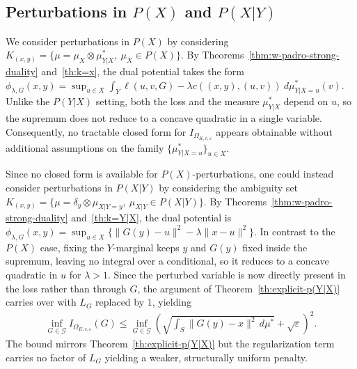 \documentclass{article}
\newcommand{\Okc}{\Omega_{K, c, \varepsilon}}
\newcommand{\phifix}{\phi_{\lambda, G}}
\theoremstyle{definition}
\theoremstyle{remarksty}
\begin{document}
\subsection{Perturbations in $P(X)$ and $P(X|Y)$}
We consider perturbations in $P(X)$ by considering $K_{(x,y)}=\{\mu =\mu_X\otimes \mu_{Y|X}^*,\ \mu_X \in P(X)\}$. By Theorems~\ref{thm:w-padro-strong-duality} and~\ref{th:k=x}, the dual potential takes the form $\phifix (x,y) = \sup_{u \in X} \int_Y \ell(u,v,G) - \lambda c((x,y),(u,v))\ d\mu^*_{Y|X=u}(v)$. Unlike the $P(Y|X)$ setting, both the loss and the measure $\mu_{Y|X}^*$ depend on $u$, so the supremum does not reduce to a concave quadratic in a single variable. Consequently, no tractable closed form for $I_{\Okc}$ appears obtainable without additional assumptions on the family $\{\mu_{Y|X=u}^*\}_{u \in X}$.

Since no closed form is available for $P(X)$-perturbations, one could instead consider perturbations in $P(X|Y)$ by considering the ambiguity set $K_{(x,y)}=\{\mu =\delta_y \otimes \mu_{X|Y=y},\ \mu_{X|Y} \in P(X|Y)\}$. By Theorems~\ref{thm:w-padro-strong-duality} and~\ref{th:k=Y|X}, the dual potential is $\phifix(x,y)=\sup_{u \in X}\{\|G(y)-u\|^2-\lambda\|x-u\|^2\}$. In contrast to the $P(X)$ case, fixing the $Y$-marginal keeps $y$ and $G(y)$ fixed inside the supremum, leaving no integral over a conditional, so it reduces to a concave quadratic in $u$ for $\lambda>1$. Since the perturbed variable is now directly present in the loss rather than through $G$, the argument of Theorem~\ref{th:explicit-p(Y|X)} carries over with $L_G$ replaced by $1$, yielding
\begin{align*}
   \inf_{G \in \mathcal{G}} I_{\Okc}(G) \leq \inf_{G \in \mathcal{G}}
   \left( \sqrt{\int_S \|G(y)-x\|^2\, d\mu^*}
   + \sqrt{\varepsilon} \right)^2.
\end{align*}
The bound mirrors Theorem~\ref{th:explicit-p(Y|X)} but the regularization term carries no factor of $L_G$ yielding a weaker, structurally uniform penalty.
\end{document}
